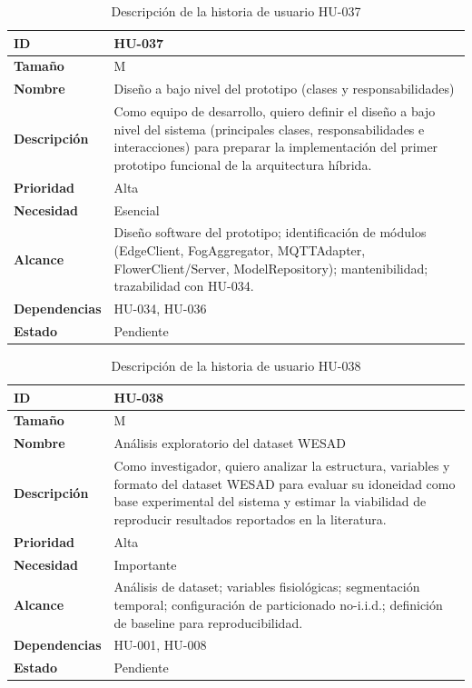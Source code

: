 \documentclass{report}
\begin{document}
\begin{table}[H]
\centering
\caption{Descripción de la historia de usuario HU-037}
\label{tab:hu037}
\begin{tabular}{|l|p{12cm}|}
\hline
\textbf{ID} & HU-037 \\ \hline
\textbf{Tamaño} & M \\ \hline
\textbf{Nombre} & Diseño a bajo nivel del prototipo (clases y responsabilidades) \\ \hline
\textbf{Descripción} &
Como equipo de desarrollo, quiero definir el diseño a bajo nivel del sistema (principales clases, responsabilidades e interacciones) para preparar la implementación del primer prototipo funcional de la arquitectura híbrida. \\ \hline
\textbf{Prioridad} & Alta \\ \hline
\textbf{Necesidad} & Esencial \\ \hline
\textbf{Alcance} &
Diseño software del prototipo; identificación de módulos (EdgeClient, FogAggregator, MQTTAdapter, FlowerClient/Server, ModelRepository); mantenibilidad; trazabilidad con HU-034. \\ \hline
\textbf{Dependencias} & HU-034, HU-036 \\ \hline
\textbf{Estado} & Pendiente \\ \hline
\end{tabular}
\end{table}



\begin{table}[H]
\centering
\caption{Descripción de la historia de usuario HU-038}
\label{tab:hu038}
\begin{tabular}{|l|p{12cm}|}
\hline
\textbf{ID} & HU-038 \\ \hline
\textbf{Tamaño} & M \\ \hline
\textbf{Nombre} & Análisis exploratorio del dataset WESAD \\ \hline
\textbf{Descripción} &
Como investigador, quiero analizar la estructura, variables y formato del dataset WESAD para evaluar su idoneidad como base experimental del sistema y estimar la viabilidad de reproducir resultados reportados en la literatura. \\ \hline
\textbf{Prioridad} & Alta \\ \hline
\textbf{Necesidad} & Importante \\ \hline
\textbf{Alcance} &
Análisis de dataset; variables fisiológicas; segmentación temporal; configuración de particionado no-i.i.d.; definición de baseline para reproducibilidad. \\ \hline
\textbf{Dependencias} & HU-001, HU-008 \\ \hline
\textbf{Estado} & Pendiente \\ \hline
\end{tabular}
\end{table}
\end{document}
